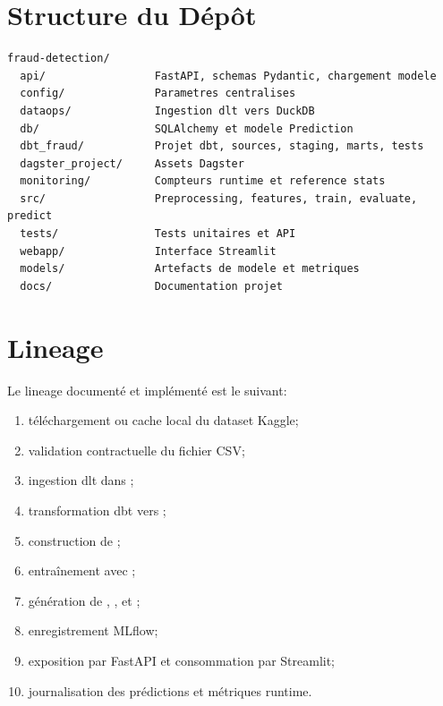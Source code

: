 \section{Structure du Dépôt}

\begin{lstlisting}
fraud-detection/
  api/                 FastAPI, schemas Pydantic, chargement modele
  config/              Parametres centralises
  dataops/             Ingestion dlt vers DuckDB
  db/                  SQLAlchemy et modele Prediction
  dbt_fraud/           Projet dbt, sources, staging, marts, tests
  dagster_project/     Assets Dagster
  monitoring/          Compteurs runtime et reference stats
  src/                 Preprocessing, features, train, evaluate, predict
  tests/               Tests unitaires et API
  webapp/              Interface Streamlit
  models/              Artefacts de modele et metriques
  docs/                Documentation projet
\end{lstlisting}

\section{Lineage}

Le lineage documenté et implémenté est le suivant:

\begin{enumerate}
    \item téléchargement ou cache local du dataset Kaggle;
    \item validation contractuelle du fichier CSV;
    \item ingestion dlt dans ;
    \item transformation dbt vers ;
    \item construction de ;
    \item entraînement avec ;
    \item génération de , ,  et ;
    \item enregistrement MLflow;
    \item exposition par FastAPI et consommation par Streamlit;
    \item journalisation des prédictions et métriques runtime.
\end{enumerate}
